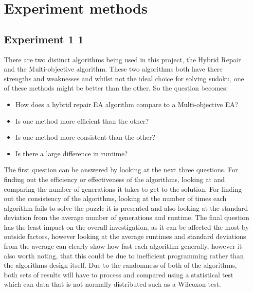 \documentclass[a4paper,11pt]{article}
\begin{document}
\section{Experiment methods}

\subsection{Experiment 1 1}
There are two distinct algorithms being used in this project, the Hybrid Repair and the Multi-objective algorithm. These two algorithms both have there strengths and weaknesses and whilst not the ideal choice for solving sudoku, one of these methods might be better than the other. So the question becomes: 
\begin{itemize} 
     \item How does a hybrid repair EA algorithm compare to a Multi-objective EA? 
     \item Is one method more efficient than the other?
     \item Is one method more consistent than the other?
     \item Is there a large difference in runtime?
\end{itemize}
The first question can be answered by looking at the next three questions. For finding out the efficiency or effectiveness of the algorithms, looking at and comparing the number of generations it takes to get to the solution.  For finding out the consistency of the algorithms, looking at the number of times each algorithm fails to solve the puzzle it is presented and also looking at the standard deviation from the average number of generations and runtime. \newline \newline The final question has the least impact on the overall investigation, as it can be affected the most by outside factors, however looking at the average runtimes and standard deviations from the average can clearly show how fast each algorithm generally, however it also worth noting, that this could be due to inefficient programming rather than the algorithms design itself. Due to the randomness of both of the algorithms, both sets of results will have to process and compared using a statistical test which can data that is not normally distributed such as a Wilcoxon test.
\end{document}
